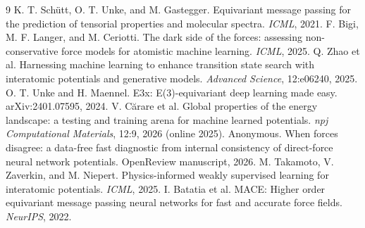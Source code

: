 \documentclass{article}
\begin{document}
\begin{thebibliography}{9}
\small
{} K. T. Sch\"utt, O. T. Unke, and M. Gastegger. Equivariant message passing for the prediction of tensorial properties and molecular spectra. \emph{ICML}, 2021.
 F. Bigi, M. F. Langer, and M. Ceriotti. The dark side of the forces: assessing non-conservative force models for atomistic machine learning. \emph{ICML}, 2025.
 Q. Zhao et al. Harnessing machine learning to enhance transition state search with interatomic potentials and generative models. \emph{Advanced Science}, 12:e06240, 2025.
 O. T. Unke and H. Maennel. E3x: E(3)-equivariant deep learning made easy. arXiv:2401.07595, 2024.
 V. C\u{a}rare et al. Global properties of the energy landscape: a testing and training arena for machine learned potentials. \emph{npj Computational Materials}, 12:9, 2026 (online 2025).
 Anonymous. When forces disagree: a data-free fast diagnostic from internal consistency of direct-force neural network potentials. OpenReview manuscript, 2026.
 M. Takamoto, V. Zaverkin, and M. Niepert. Physics-informed weakly supervised learning for interatomic potentials. \emph{ICML}, 2025.
 I. Batatia et al. MACE: Higher order equivariant message passing neural networks for fast and accurate force fields. \emph{NeurIPS}, 2022.
\end{thebibliography}
\end{document}
